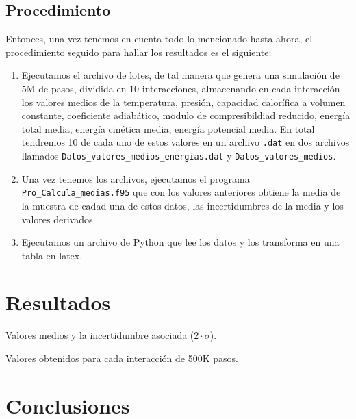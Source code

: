 \documentclass[11pt]{article} %
\begin{document}
\subsection{Procedimiento}

Entonces, una vez tenemos en cuenta todo lo mencionado hasta ahora, el procedimiento seguido para hallar los resultados es el siguiente:

\begin{enumerate}
	\item Ejecutamos el archivo de lotes, de tal manera que genera una simulación de 5M de pasos, dividida en 10 interacciones, almacenando en cada interacción los valores medios de la temperatura, presión, capacidad calorífica a volumen constante, coeficiente adiabático, modulo de compresibildiad reducido, energía total media, energía cinética media, energía potencial media. En total tendremos 10 de cada uno de estos valores en un archivo \texttt{.dat} en dos archivos llamados \texttt{Datos\_valores\_medios\_energias.dat} y \texttt{Datos\_valores\_medios}.
	
	\item Una vez tenemos los archivos, ejecutamos el programa \texttt{Pro\_Calcula\_medias.f95} que con los valores anteriores obtiene la media de la muestra de cadad una de estos datos, las incertidumbres de la media y los valores derivados. 
	
	\item Ejecutamos un archivo de Python que lee los datos y los transforma en una tabla en latex. 
\end{enumerate}


\section{Resultados}

\begin{table}[h!] \centering

\caption{Valores medios y la incertidumbre asociada ($2\cdot \sigma$).}
\label{Tab:01}
\end{table}

\begin{table}[h!] \centering

\caption{Valores obtenidos para cada interacción de 500K pasos.}
\label{Tab:02}
\end{table}
\section{Conclusiones}




	
\end{document}
